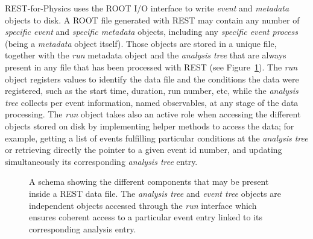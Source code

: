 REST-for-Physics uses the ROOT I/O interface to write \emph{event} and \emph{metadata} objects to disk. A ROOT file generated with REST may contain any number of \emph{specific event} and \emph{specific metadata} objects, including any \emph{specific event process} (being a \emph{metadata} object itself). Those objects are stored in a unique file, together with the \emph{run} metadata object and the \emph{analysis tree} that are always present in any file that has been processed with REST (see Figure~\ref{fig:file_contents}). The \emph{run} object registers values to identify the data file and the conditions the data were registered, such as the start time, duration, run number, etc, while the \emph{analysis tree} collects per event information, named observables, at any stage of the data processing. The \emph{run} object takes also an active role when accessing the different objects stored on disk by implementing helper methods to access the data; for example, getting a list of events fulfilling particular conditions at the \emph{analysis tree} or retrieving directly the pointer to a given event id number, and updating simultaneously its corresponding \emph{analysis tree} entry.

\begin{figure}[tb]
  \centering
	\caption{A schema showing the different components that may be present inside a REST data file. The \emph{analysis tree} and \emph{event tree} objects are independent objects accessed through the \emph{run} interface which ensures coherent access to a particular event entry linked to its corresponding analysis entry.} \label{fig:file_contents}
\end{figure}

